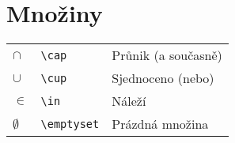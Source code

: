 \documentclass[main.tex]{subfiles}
\begin{document}
\section*{Množiny}
\begin{tabular}{ p{2em} p{7.5em} l }
  $\cap$			&	\verb|\cap|				&	Průnik (a současně)	\\
  $\cup$			&	\verb|\cup|				&	Sjednoceno (nebo)		\\
  $\in$				&	\verb|\in|				&	Náleží							\\
  $\emptyset$	&	\verb|\emptyset|	&	Prázdná množina			\\
\end{tabular}
\end{document}
